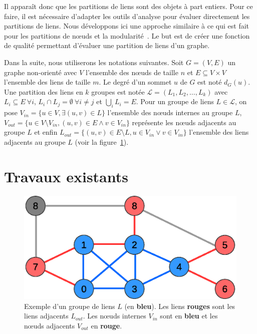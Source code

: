 Il apparaît donc que les partitions de liens sont des objets à part entiers.
Pour ce faire, il est nécessaire d'adapter les outils d'analyse pour évaluer directement les partitions de liens.
Nous développons ici une approche similaire à ce qui est fait pour les partitions de n\oe uds et la modularité~\cite{Newman2004}.
Le but est de créer une fonction de qualité permettant d'évaluer une partition de liens d'un graphe.

Dans la suite, nous utiliserons les notations suivantes.
Soit $G=(V,E)$ un graphe non-orienté avec $V$ l'ensemble des n\oe uds de taille $n$ et $E \subseteq V \times V$ l'ensemble des liens de taille $m$. 
Le degré d'un sommet $u$ de $G$ est noté $d_G(u)$.
Une partition des liens en $k$ groupes est notée $\mathcal{L}=(L_1,L_2,\ldots,L_k)$ avec $L_i \subseteq E \ \forall i$, $L_i\cap L_j=\emptyset \ \forall i\neq j$ et $\bigcup_i L_i=E$.
Pour un groupe de liens $L \in \mathcal{L}$, on pose $V_{in}=\{u \in V, \exists (u,v) \in L\}$ l'ensemble des n\oe uds internes au groupe $L$, $V_{out}=\{u \in V\setminus V_{in}, (u,v) \in E \wedge v \in V_{in} \}$ représente les n\oe uds adjacents au groupe $L$ et enfin $L_{out}=\{(u,v) \in E \setminus L, u \in V_{in} \vee v \in V_{in} \}$ l'ensemble des liens adjacents au groupe $L$ (voir la figure~\ref{fig:example_def_expected}).

\section{Travaux existants}

\begin{figure}
\centering
\includegraphics[width=0.4\linewidth]{img/ExpectedNodes/exemple2}
\caption{Exemple d'un groupe de liens $L$ (en \textcolor{semilightblue}{\textbf{bleu}}). Les liens \textcolor{pinkyred}{\textbf{rouges}} sont les liens adjacents $L_{out}$.
Les n\oe uds internes $V_{in}$ sont en \textcolor{semilightblue}{\textbf{bleu}} et les n\oe uds adjacents $V_{out}$ en  \textcolor{pinkyred}{\textbf{rouge}}.}
\label{fig:example_def_expected}
\end{figure}

